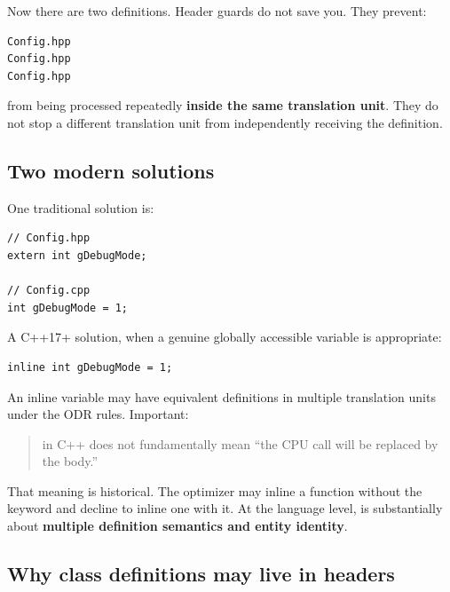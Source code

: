 Now there are two definitions. Header guards do not save you. They prevent:

\begin{verbatim}
Config.hpp
Config.hpp
Config.hpp
\end{verbatim}

from being processed repeatedly \textbf{inside the same translation unit}. They do not stop a different translation unit from independently receiving the definition.

\subsection{Two modern solutions}\label{05-engine-i-ch002-two-modern-solutions}

\hypertarget{05-engine-i-ch002-two-modern-solutions}{}

One traditional solution is:

\begin{verbatim}
// Config.hpp
extern int gDebugMode;

// Config.cpp
int gDebugMode = 1;
\end{verbatim}

A C++17+ solution, when a genuine globally accessible variable is appropriate:

\begin{verbatim}
inline int gDebugMode = 1;
\end{verbatim}

An inline variable may have equivalent definitions in multiple translation units under the ODR rules. Important:

\begin{quote}
 in C++ does not fundamentally mean ``the CPU call will be replaced by the body.''
\end{quote}

That meaning is historical. The optimizer may inline a function without the  keyword and decline to inline one with it. At the language level,  is substantially about \textbf{multiple definition semantics and entity identity}.

\subsection{Why class definitions may live in headers}\label{05-engine-i-ch002-why-class-definitions-may-live-in-headers}

